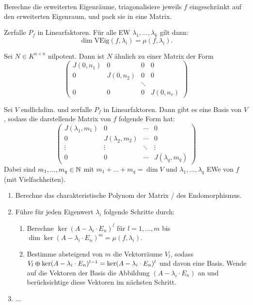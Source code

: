 \documentclass{cheat-sheet}
\newcommand{\VEig}{\mathrm{VEig}}
\begin{document}
\begin{verf}
Berechne die erweiterten Eigenräume, triagonalisiere jeweils $f$ eingeschränkt auf den erweiterten Eigenraum, und pack sie in eine Matrix.
\end{verf}

\begin{satz}
Zerfalle $P_f$ in Linearfaktoren. Für alle EW $\lambda_1, ..., \lambda_k$ gilt dann:
\[ \dim \VEig(f, \lambda_i) = \mu(f, \lambda_i). \]
\end{satz}

\begin{satz}
Sei $N \in K^{n \times n}$ nilpotent. Dann ist $N$ ähnlich zu einer Matrix der Form
\[ \begin{pmatrix}
J(0, n_1) & 0 & 0 & 0 \\
0 & J(0, n_2) & 0 & 0 \\
& & \ddots & \\
0 & 0 & 0 & J(0, n_r)
\end{pmatrix} \]
\end{satz}


\begin{satz}
Sei $V$ endlichdim. und zerfalle $P_f$ in Linearfaktoren. Dann gibt es eine Basis von $V$, sodass die darstellende Matrix von $f$ folgende Form hat:
\[ \begin{pmatrix}
J(\lambda_1, m_1) & 0 & \cdots & 0 \\
0 & J(\lambda_2, m_2) & \cdots & 0 \\
\vdots & \vdots & \ddots & \vdots \\
0 & 0 & \cdots & J(\lambda_q, m_q)
\end{pmatrix} \]
Dabei sind $m_1, ..., m_q \in \mathbb{N}$ mit $m_1 + ... + m_q = \dim V$ und $\lambda_1, ..., \lambda_q$ EWe von $f$ (mit Vielfachheiten).
\end{satz}


\begin{verf}[JNF]
\begin{enumerate}
  \item Berechne das charakteristische Polynom der Matrix / des Endomorphismus.
  \item Führe für jeden Eigenwert $\lambda_i$ folgende Schritte durch:
  \begin{enumerate}
    \item Berechne $\ker (A - \lambda_i \cdot E_n)^l$ für $l = 1, ..., m$ bis $\dim \ker (A - \lambda_i \cdot E_n)^m = \mu(f, \lambda_i)$.
    \item Bestimme absteigend von $m$ die Vektorräume $V_l$, sodass $V_l \varoplus \ker (A - \lambda_i \cdot E_n)^{l-1} = \ker (A - \lambda_i \cdot E_n)^{l}$ und davon eine Basis. Wende auf die Vektoren der Basis die Abbildung $(A - \lambda_i \cdot E_n)$ an und berücksichtige diese Vektoren im nächsten Schritt.
  \end{enumerate}
  \item ...
\end{enumerate}
\end{verf}
\end{document}

